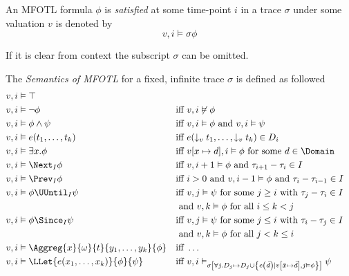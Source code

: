 \begin{definition}
    \label{def:mfotl-satisfaction}
    An MFOTL formula $\phi$ is \emph{satisfied} at some time-point $i$ in a trace $\sigma$ under
    some valuation $v$ is denoted by
    \begin{equation*}
        v,i \vDash \sigma \phi
    \end{equation*}
\end{definition}
If it is clear from context the subscript $\sigma$ can be omitted.
\begin{definition}
    \label{def:mfotl-semantics}
    The \emph{Semantics of MFOTL} for a fixed, infinite trace $\sigma$ is defined as followed
    \begin{align*}
        v, i &\vDash  \top \\
        v, i &\vDash  \neg \phi
            &&\text{iff } v, i \not\vDash  \phi \\
        v, i &\vDash  \phi \wedge \psi
            &&\text{iff } v, i \vDash  \phi \text{ and } v, i \vDash  \psi \\
        v, i &\vDash  e(t_1, \dots, t_k)
            &&\text{iff } e(\downarrow_v t_1, \dots, \downarrow_v t_k) \in D_i \\
        v, i &\vDash  \exists x. \phi
            &&\text{iff } v[x \mapsto d], i \vDash  \phi \text{ for some } d \in \Domain \\
        v, i &\vDash  \Next_I \phi
            &&\text{iff } v, i+1 \vDash  \phi \text{ and } \tau_{i+1} - \tau_i \in I \\
        v, i &\vDash  \Prev_I \phi
            &&\text{iff } i>0 \text{ and } v, i-1 \vDash  \phi
            \text{ and } \tau_i - \tau_{i-1} \in I \\
        v, i &\vDash  \phi \UUntil_I \psi
            &&\text{iff } v, j \vDash  \psi \text{ for some } j \geq i
            \text{ with } \tau_j - \tau_i \in I \\
            &&&
            \text{ and } v, k \vDash  \phi \text{ for all } i \leq k < j \\
        v, i &\vDash  \phi \Since_I \psi
            &&\text{iff } v, j \vDash  \psi \text{ for some } j \leq i
            \text{ with } \tau_i - \tau_j \in I \\
            &&&
            \text{ and } v, k \vDash  \phi \text{ for all } j < k \leq i \\
        v, i &\vDash  \Aggreg{x}{\omega}{t}{y_1, \dots, y_k}{\phi}
            &&\text{iff } \dots %
        \\
        v, i &\vDash  \LLet{e(x_1, \dots, x_k)}{\phi}{\psi}
            && \text{iff } v, i \vDash_{\sigma \left[ \forall j. D_j \mapsto D_j \cup \left\lbrace e\left(\bar{d}\right) \mid v\left[\bar{x} \mapsto \bar{d}\right], j \vDash \phi \right\rbrace \right]} \psi
    \end{align*}
    

\end{definition}
